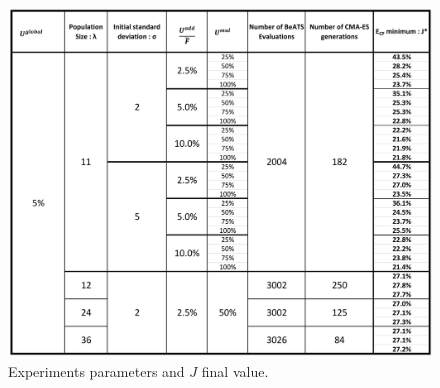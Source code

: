 \begin{figure}
\centering
	\label{fig:results_array}
	\caption{Experiments parameters and $J$ final value.}
	\includegraphics[width=7in]{figures/results_array.png}
\end{figure}



